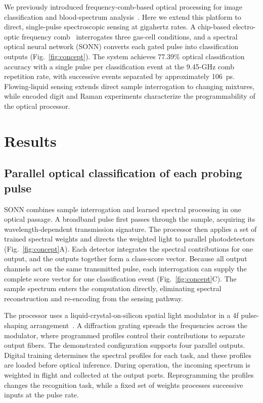 \documentclass[11pt]{article}
\begin{document}
We previously introduced frequency-comb-based optical processing for image classification and blood-spectrum analysis~\cite{li2025cleo}. Here we extend this platform to direct, single-pulse spectroscopic sensing at gigahertz rates. A chip-based electro-optic frequency comb~\cite{zhang2019,yu2022} interrogates three gas-cell conditions, and a spectral optical neural network (SONN) converts each gated pulse into classification outputs (Fig.~\ref{fig:concept}). The system achieves 77.39\% optical classification accuracy with a single pulse per classification event at the 9.45-GHz comb repetition rate, with successive events separated by approximately 106~ps. Flowing-liquid sensing extends direct sample interrogation to changing mixtures, while encoded digit and Raman experiments characterize the programmability of the optical processor.

\section{Results}
\subsection{Parallel optical classification of each probing pulse}
SONN combines sample interrogation and learned spectral processing in one optical passage. A broadband pulse first passes through the sample, acquiring its wavelength-dependent transmission signature. The processor then applies a set of trained spectral weights and directs the weighted light to parallel photodetectors (Fig.~\ref{fig:concept}A). Each detector integrates the spectral contributions for one output, and the outputs together form a class-score vector. Because all output channels act on the same transmitted pulse, each interrogation can supply the complete score vector for one classification event (Fig.~\ref{fig:concept}C). The sample spectrum enters the computation directly, eliminating spectral reconstruction and re-encoding from the sensing pathway.

The processor uses a liquid-crystal-on-silicon spatial light modulator in a 4f pulse-shaping arrangement~\cite{weiner2000}. A diffraction grating spreads the frequencies across the modulator, where programmed profiles control their contributions to separate output fibers. The demonstrated configuration supports four parallel outputs. Digital training determines the spectral profiles for each task, and these profiles are loaded before optical inference. During operation, the incoming spectrum is weighted in flight and collected at the output ports. Reprogramming the profiles changes the recognition task, while a fixed set of weights processes successive inputs at the pulse rate.
\end{document}
